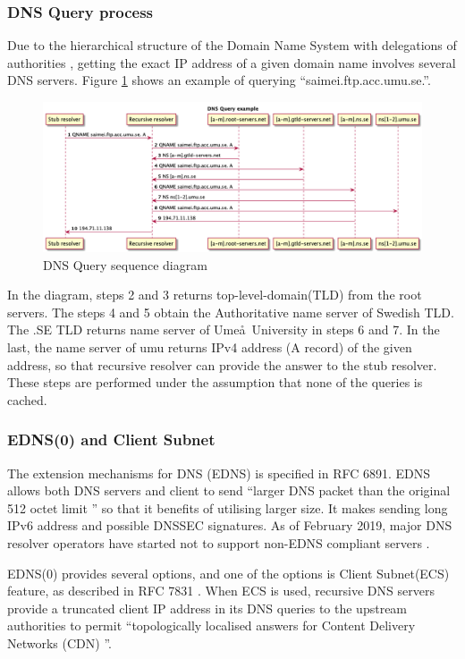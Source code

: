 \subsubsection{DNS Query process}
Due to the hierarchical structure of the Domain Name System with delegations of authorities \cite{rfc1591}, getting the exact IP address of a given domain name involves several DNS servers. Figure \ref{queryprocess} shows an example of querying ``saimei.ftp.acc.umu.se.''. 
\begin{figure}[ht!]
    \begin{center}
        \includegraphics*[width=\columnwidth]{img/dnsquery}
    \end{center}
    \caption{DNS Query sequence diagram}
    \label{queryprocess}
\end{figure}
In the diagram, steps 2 and 3 returns top-level-domain(TLD) from the root servers. The steps 4 and 5 obtain the Authoritative name server of Swedish TLD. The .SE TLD returns name server of Ume\aa\ University in steps 6 and 7. In the last, the name server of umu returns IPv4 address (A record) of the given address, so that recursive resolver can provide the answer to the stub resolver. These steps are performed under the assumption that none of the queries is cached. 
\subsubsection{EDNS(0) and Client Subnet}
The extension mechanisms for DNS (EDNS) is specified in RFC 6891.
EDNS allows both DNS servers and client to send ``larger DNS packet than the original 512 octet limit \cite{rfc6891}'' so that it benefits of utilising larger size.
It makes sending long IPv6 address and possible DNSSEC signatures.
As of February 2019, major DNS resolver operators have started not to support non-EDNS compliant servers \cite{dns-flag-day, spacek-edns-camel-diet}. 

EDNS(0) provides several options, and one of the options is Client Subnet(ECS) feature, as described in RFC 7831 \cite{rfc7871}. When ECS is used, recursive DNS servers provide a truncated client IP address in its DNS queries to the upstream authorities to permit ``topologically localised answers for Content Delivery Networks (CDN) \cite{kintis2016understanding}''.
